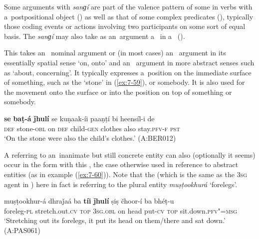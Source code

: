 Some arguments with \textit{sanɡí} are part of the valence pattern of some in verbs with a~postpositional object () as well as that of some complex predicates (), typically those coding events or actions involving two participants on some sort of equal basis. The  \textit{sanɡí} may also take as an~argument a~ in a~  ().


 This  takes an~ nominal argument or (in most cases) an~  argument in its essentially spatial sense `on, onto' and an~  argument in more abstract senses such as `about, concerning'. It typically expresses a~position on the immediate surface of something, such as the `stone' in (\ref{ex:7-59}), or somebody. It is also used for the movement onto the surface or into the position on top of something or somebody.

\begin{exe}
\ex
\label{ex:7-59}
\gll \textbf{se} \textbf{baṭ-á} \textbf{ǰhulí} se kuṇaak-íi paaṇṭí bi heensíl-i de \\
\textsc{def} stone-\textsc{obl} on \textsc{def}  child-\textsc{gen}  clothes also  stay.\textsc{pfv-f} \textsc{pst } \\
\glt `On the stone were also the child's clothes.' (A:BER012)
\end{exe}


A  referring to an~inanimate but still concrete entity can also (optionally it seems) occur in the  form with this , the case otherwise used in  reference to abstract entities (as in example (\ref{ex:7-60})). Note that the   (which is the same as the \textsc{3sg} agent in ) here in fact is referring to the plural entity \textit{muṣṭookhurá} `forelegs'.

\ea
\ex
\label{ex:7-60}
\gll muṣṭookhur-á dhraǰaá ba \textbf{tíi} \textbf{ǰhulí} ṣiṣ čhoor-í ba bhéṭ-u\\
foreleg-\textsc{pl} stretch.out.\textsc{cv} \textsc{top} \textsc{3sg.obl} on head put-\textsc{cv} \textsc{top} sit.down.\textsc{pfv"=msg}\\
\glt `Stretching out its forelegs, it put its head on them/there and sat down.' (A:PAS061)
\z

